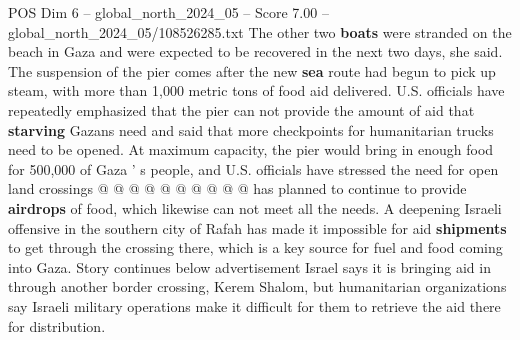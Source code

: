 \begin{textsample}{POS Dim 6 – global\_north\_2024\_05 – Score 7.00 – global\_north\_2024\_05/108526285.txt}
The other two \textbf{boats} were stranded on the beach in Gaza and were expected to be recovered in the next two days, she said.
The suspension of the pier comes after the new \textbf{sea} route had begun to pick up steam, with more than 1,000 metric tons of food aid delivered.
U.S. officials have repeatedly emphasized that the pier can not provide the amount of aid that \textbf{starving} Gazans need and said that more checkpoints for humanitarian trucks need to be opened.
At maximum capacity, the pier would bring in enough food for 500,000 of Gaza ' s people, and U.S. officials have stressed the need for open land crossings @ @ @ @ @ @ @ @ @ @ has planned to continue to provide \textbf{airdrops} of food, which likewise can not meet all the needs.
A deepening Israeli offensive in the southern city of Rafah has made it impossible for aid \textbf{shipments} to get through the crossing there, which is a key source for fuel and food coming into Gaza.
Story continues below advertisement Israel says it is bringing aid in through another border crossing, Kerem Shalom, but humanitarian organizations say Israeli military operations make it difficult for them to retrieve the aid there for distribution.

\end{textsample}
